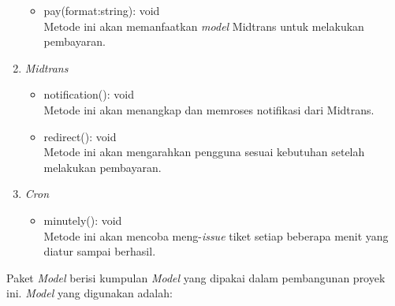 \begin{enumerate}
\begin{itemize}
        \item pay(format:string): void\\
        Metode ini akan memanfaatkan \textit{model} Midtrans untuk melakukan pembayaran.
     \end{itemize}
    
    \item \textit{Midtrans}
    \begin{itemize}
        \item notification(): void\\
        Metode ini akan menangkap dan memroses notifikasi dari Midtrans.

        \item redirect(): void\\
        Metode ini akan mengarahkan pengguna sesuai kebutuhan setelah melakukan pembayaran.
    \end{itemize}
    
    \item \textit{Cron}
    \begin{itemize}
        \item minutely(): void\\
        Metode ini akan mencoba meng-\textit{issue} tiket setiap beberapa menit yang diatur sampai berhasil.
    \end{itemize}
    
\end{enumerate}

Paket \textit{Model} berisi kumpulan \textit{Model} yang dipakai dalam pembangunan proyek ini. \textit{Model} yang digunakan adalah:

